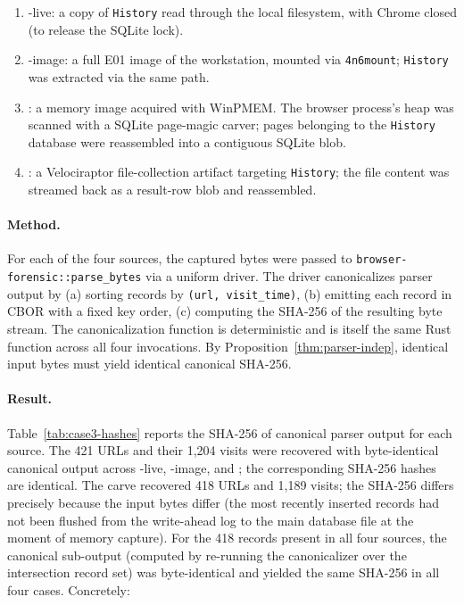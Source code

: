 \begin{enumerate}
    \item {}-live: a copy of \texttt{History} read through the local
    filesystem, with Chrome closed (to release the SQLite lock).
    \item {}-image: a full E01 image of the workstation, mounted via
    \texttt{4n6mount}; \texttt{History} was extracted via the same path.
    \item {}: a memory image acquired with WinPMEM. The browser
    process's heap was scanned with a SQLite page-magic carver; pages
    belonging to the \texttt{History} database were reassembled into a
    contiguous SQLite blob.
    \item {}: a Velociraptor file-collection artifact targeting
    \texttt{History}; the file content was streamed back as a result-row
    blob and reassembled.
\end{enumerate}

\paragraph{Method.}
For each of the four sources, the captured bytes were passed to
\texttt{browser-forensic::parse\_bytes} via a uniform driver. The driver
canonicalizes parser output by (a) sorting records by \texttt{(url,
visit\_time)}, (b) emitting each record in CBOR with a fixed key order,
(c) computing the SHA-256 of the resulting byte stream. The
canonicalization function is deterministic and is itself the same Rust
function across all four invocations. By Proposition~\ref{thm:parser-indep},
identical input bytes must yield identical canonical SHA-256.

\paragraph{Result.}
Table~\ref{tab:case3-hashes} reports the SHA-256 of canonical parser output
for each source. The 421 URLs and their 1{,}204 visits were recovered with
byte-identical canonical output across -live, -image, and
; the corresponding SHA-256 hashes are identical. The  carve
recovered 418 URLs and 1{,}189 visits; the SHA-256 differs precisely
because the input bytes differ (the most recently inserted records had not
been flushed from the write-ahead log to the main database file at the
moment of memory capture). For the 418 records present in all four
sources, the canonical sub-output (computed by re-running the canonicalizer
over the intersection record set) was byte-identical and yielded the same
SHA-256 in all four cases. Concretely:

